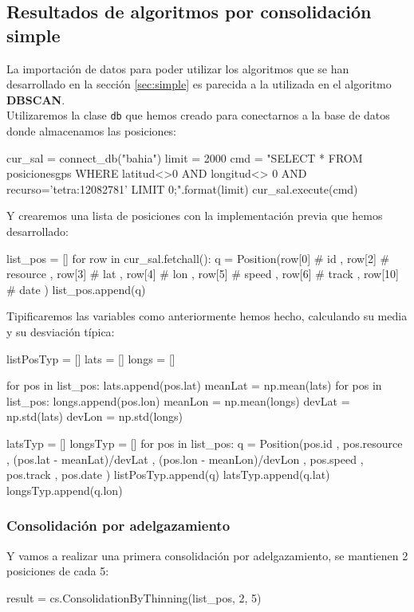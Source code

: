 \documentclass[a4paper, 12pt]{article}
\begin{document}
\subsection{Resultados de algoritmos por consolidaci\'on simple}

La importaci\'on de datos para poder utilizar los algoritmos que se han desarrollado en la secci\'on \ref{sec:simple} es parecida a la utilizada en el algoritmo \textbf{DBSCAN}.\\ 

Utilizaremos la clase \texttt{db} que hemos creado para conectarnos a la base de datos donde almacenamos las posiciones:

\begin{python}
cur_sal = connect_db("bahia")
limit = 2000
cmd = "SELECT * FROM posicionesgps WHERE latitud<>0 
			AND longitud<> 0 AND recurso='tetra:12082781' 
			LIMIT {0};".format(limit)
cur_sal.execute(cmd)
\end{python}

Y crearemos una lista de posiciones con la implementaci\'on previa que hemos desarrollado:\\

\begin{python}
list_pos = []
for row in cur_sal.fetchall():
	q = Position(row[0] # id
		, row[2] # resource
		, row[3] # lat
		, row[4] # lon
		, row[5] # speed
		, row[6] # track
		, row[10] # date
		)
	list_pos.append(q)
\end{python}

Tipificaremos las variables como anteriormente hemos hecho, calculando su media y su desviaci\'on t\'ipica:\\

\begin{python}
listPosTyp = []
lats = []
longs = []

for pos in list_pos:
    lats.append(pos.lat)
meanLat = np.mean(lats)
for pos in list_pos:
    longs.append(pos.lon)
meanLon = np.mean(longs)
devLat = np.std(lats)
devLon = np.std(longs)

latsTyp = []
longsTyp = []
for pos in list_pos:
	q = Position(pos.id
	, pos.resource
	, (pos.lat - meanLat)/devLat
	, (pos.lon - meanLon)/devLon
	, pos.speed
	, pos.track
	, pos.date
	)
	listPosTyp.append(q)
	latsTyp.append(q.lat)
	longsTyp.append(q.lon)
\end{python}

\pagebreak
\subsubsection{Consolidaci\'on por adelgazamiento}
Y vamos a realizar una primera consolidaci\'on por adelgazamiento, se mantienen 2 posiciones de cada 5:\\
\bigskip
\begin{python}
result = cs.ConsolidationByThinning(list_pos, 2, 5)
\end{python}
\end{document}
